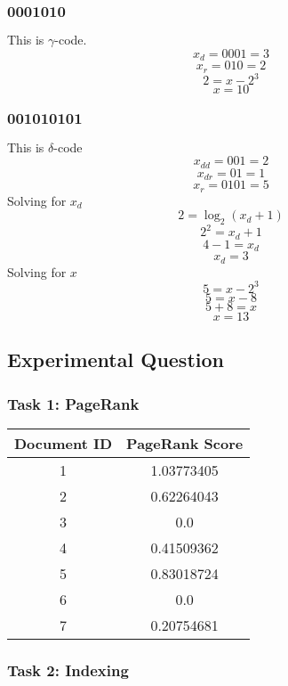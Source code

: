 \subsubsection*{$\textbf{0001010}$}
This is $\gamma$-code.
$$
x_d = 0001 = 3
$$
$$
x_r = 010 = 2
$$
$$
2 = x - 2^3
$$
$$
x = 10
$$

\subsubsection*{$\textbf{001010101}$}
This is $\delta$-code
$$
x_{dd} = 001 = 2
$$
$$
x_{dr} = 01 = 1
$$
$$
x_r = 0101 = 5
$$
Solving for $x_d$
$$
2 = \log_2(x_d + 1)
$$
$$
2^2 = x_d + 1
$$
$$
4 - 1 = x_d
$$
$$
x_d = 3
$$
Solving for $x$
$$
5 = x - 2^3
$$
$$
5 = x - 8
$$
$$
5 + 8 = x
$$
$$
x = 13
$$

\subsection*{Experimental Question}
\subsubsection*{Task 1: PageRank}
\begin{center} 
\begin{tabular}{| c | c |} \hline
\textbf{Document ID} & \textbf{PageRank Score}  \\ \hline
1 & 1.03773405 \\ \hline
2 & 0.62264043 \\ \hline
3 & 0.0 \\ \hline
4 & 0.41509362 \\ \hline
5 & 0.83018724 \\ \hline
6 & 0.0 \\ \hline
7 & 0.20754681 \\ \hline        
\end{tabular}
\end{center}

\subsubsection*{Task 2: Indexing}